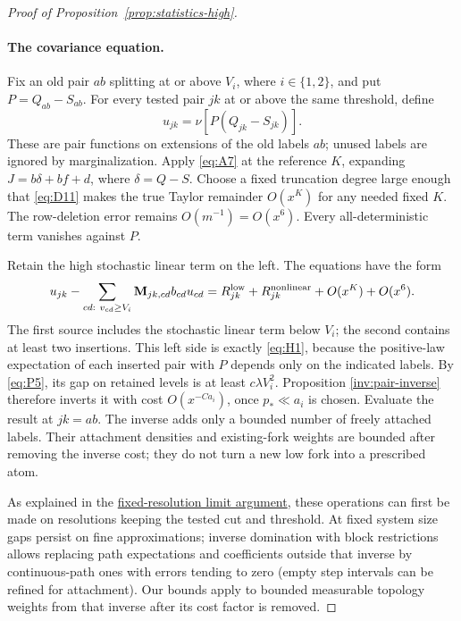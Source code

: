 \begin{proof}[Proof of Proposition~\ref{prop:statistics-high}]
\leavevmode\par
\paragraph{The covariance equation.}
Fix an old pair $ab$ splitting at or above $V_i$, where
$i\in\{1,2\}$, and put $P=Q_{ab}-S_{ab}$.  For every tested pair
$jk$ at or above the same threshold, define
\[
 u_{jk}=\nu[P(Q_{jk}-S_{jk})].
\]
These are pair functions on extensions of the old labels $ab$; unused
labels are ignored by marginalization.  Apply \eqref{eq:A7} at the
reference $K$, expanding $J=b\delta+bf+d$, where
$\delta=Q-S$.  Choose a fixed truncation degree large enough that
\eqref{eq:D11} makes the true Taylor remainder $O(x^K)$ for any needed
fixed $K$.  The row-deletion error remains $O(m^{-1})=O(x^6)$.
Every all-deterministic term vanishes against $P$.

Retain the high stochastic linear term on the left.  The equations
have the form
\[
 u_{jk}-\sum_{cd:\ v_{cd}\ge V_i}{\bf M}_{jk,cd}b_{cd}u_{cd}
       =R_{jk}^{\rm low}+R_{jk}^{\rm nonlinear}
                         +O(x^K)+O(x^6).
\]
The first source includes the stochastic linear term below $V_i$;
the second contains at least two insertions.  This left side is exactly
\eqref{eq:H1}, because the positive-law expectation of each inserted
pair with $P$ depends only on the indicated labels.  By \eqref{eq:P5},
its gap on retained levels is at least $c\lambda V_i^2$.  Proposition
\ref{inv:pair-inverse} therefore inverts it with cost $O(x^{-Ca_i})$,
once $p_*\ll a_i$ is chosen.  Evaluate the result at $jk=ab$.
The inverse adds only a bounded number of freely attached labels.
Their attachment densities and existing-fork weights are bounded after
removing the inverse cost; they do not turn a new low fork into a
prescribed atom.

As explained in the \hyperref[par:inverse-limits]{fixed-resolution limit argument}, these operations can first be made on resolutions keeping the tested cut and threshold. At fixed system size gaps persist on fine approximations; inverse domination with block restrictions allows replacing path expectations and coefficients outside that inverse by continuous-path ones with errors tending to zero (empty step intervals can be refined for attachment). Our bounds apply to bounded measurable topology weights from that inverse after its cost factor is removed.


\end{proof}
